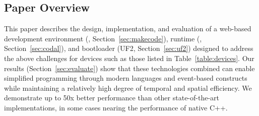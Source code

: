 \subsection{Paper Overview}
This paper describes the design, implementation, and evaluation of a web-based development environment (\MCN, Section~\ref{sec:makecode}), runtime (\CON, Section~\ref{sec:codal}), and bootloader (UF2, Section~\ref{sec:uf2}) designed to address the above challenges for devices such as those listed in Table~\ref{table:devices}. Our results (Section~\ref{sec:evaluate}) show that these technologies combined can enable simplified programming through modern languages and event-based constructs while maintaining a relatively high degree of temporal and spatial efficiency. We demonstrate up to 50x better performance than other state-of-the-art implementations, in some cases nearing the performance of native C++.









